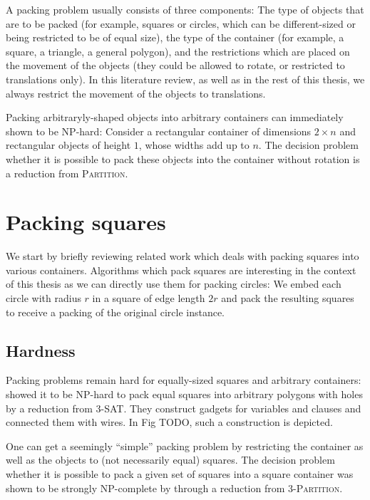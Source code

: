 \documentclass[a4paper,style=print,bibliography=totoc,nexus,lnum,extramargin]{tubsbook}
\begin{document}
A packing problem usually consists of three components: The type of objects that are to be packed (for example, squares or circles, which can be different-sized or being restricted to be of equal size), the type of the container (for example, a square, a triangle, a general polygon), and the restrictions which are placed on the movement of the objects (they could be allowed to rotate, or restricted to translations only). In this literature review, as well as in the rest of this thesis, we always restrict the movement of the objects to translations.

Packing arbitraryly-shaped objects into arbitrary containers can immediately shown to be NP-hard: Consider a rectangular container of dimensions $2 \times n$ and rectangular objects of height $1$, whose widths add up to $n$. The decision problem whether it is possible to pack these objects into the container without rotation is a reduction from \textsc{Partition}.

\section{Packing squares}\label{sec:related-squares}

We start by briefly reviewing related work which deals with packing squares into various containers.
Algorithms which pack squares are interesting in the context of this thesis as we can directly use them for packing circles: We embed each circle with radius $r$ in a square of edge length $2r$ and pack the resulting squares to receive a packing of the original circle instance.

\subsection{Hardness}

Packing problems remain hard for equally-sized squares and arbitrary containers: \textcite{FPT1981optimal} showed it to be NP-hard to pack equal squares into arbitrary polygons with holes by a reduction from \textsc{3-SAT}. They construct gadgets for variables and clauses and connected them with wires. In Fig TODO, such a construction is depicted.

One can get a seemingly “simple” packing problem by restricting the container as well as the objects to (not necessarily equal) squares.
The decision problem whether it is possible to pack a given set of squares into a square container was shown to be strongly NP-complete by \textcite{LTWYC1990packing} through a reduction from \textsc{3-Partition}.
\end{document}
